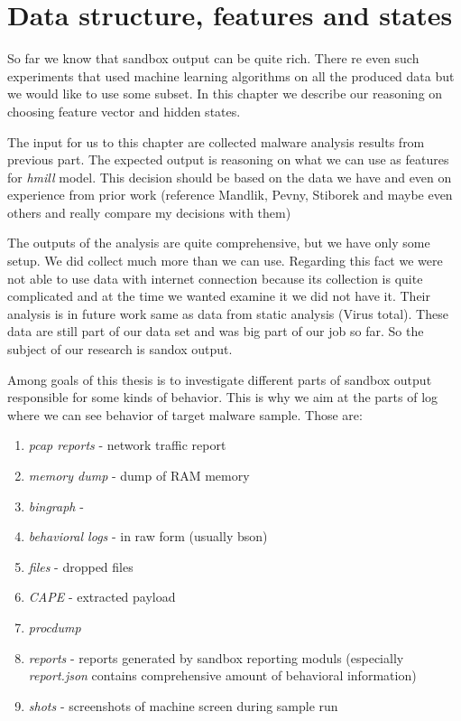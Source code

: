 \chapter{Data structure, features and states}
So far we know that sandbox output can be quite rich. There re even such experiments that used machine learning algorithms on all the produced data but we would like to use some subset. In this chapter we describe our reasoning on choosing feature vector and hidden states.

The input for us to this chapter are collected malware analysis results from previous part. The expected output is reasoning on what we can use as features for \emph{hmill} model. This decision should be based on the data we have and even on experience from prior work (reference Mandlik, Pevny, Stiborek and maybe even others and really compare my decisions with them)

The outputs of the analysis are quite comprehensive, but we have only some setup. We did collect much more than we can use. Regarding this fact we were not able to use data with internet connection because its collection is quite complicated and at the time we wanted examine it we did not have it. Their analysis is in future work same as data from static analysis (Virus total). These data are still part of our data set and was big part of our job so far. So the subject of our research is sandox output.

Among goals of this thesis is to investigate different parts of sandbox output responsible for some kinds of behavior. This is why we aim at the parts of log where we can see behavior of target malware sample. Those are:
\begin{enumerate}
  \item \emph{pcap reports} - network traffic report
  \item \emph{memory dump} - dump of RAM memory
  \item \emph{bingraph} - 
  \item \emph{behavioral logs} - in raw form (usually bson)
  \item \emph{files} - dropped files
  \item \emph{CAPE} -  extracted payload
  \item \emph{procdump}
  \item \emph{reports} - reports generated by sandbox reporting moduls (especially \emph{report.json} contains comprehensive amount of behavioral information)
  \item \emph{shots} - screenshots of machine screen during sample run
\end{enumerate}



